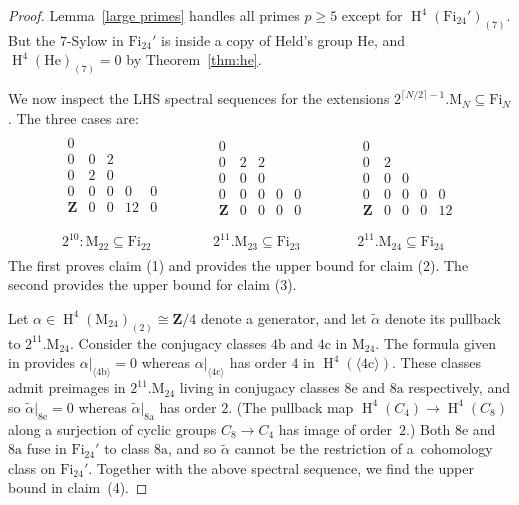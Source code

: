 \documentclass[pdftex]{sigma}
\numberwithin{equation}{section}
\newcommand\bZ{\mathbf Z}
\newcommand\ra{\mathrm a}
\newcommand\rb{\mathrm b}
\newcommand\rc{\mathrm c}
\newcommand\re{\mathrm e}
\newcommand\rM{\mathrm M}
\DeclareMathOperator\homology{H}
\renewcommand\H{\homology}
\newcommand\<\langle
\renewcommand\>\rangle
\newcommand\Fi{\mathrm{Fi}}
\begin{document}
\begin{proof}
 Lemma~\ref{large primes} handles all primes $p\geq 5$ except for $\H^4(\Fi_{24}')_{(7)}$. But the $7$-Sylow in $\Fi_{24}'$ is inside a copy of Held's group $\mathrm{He}$, and $\H^4(\mathrm{He})_{(7)} = 0$ by Theorem~\ref{thm:he}.

 We now inspect the LHS spectral sequences for the extensions $2^{\lceil N/2\rceil - 1}.\rM_N \subseteq \Fi_N$.
 The three cases are:
 \begin{gather*}
 \begin{array}{ccccc}
 \begin{array}{ccccc}
 0 \\
 0 & 0 & 2 \\
 0 & 2 & 0 \\
 0 & 0 & 0 & 0 & 0 \\
 \bZ & 0 & 0 & 12 & 0 \\
 \end{array}
 &\qquad&
 \begin{array}{ccccc}
 0 \\
 0 & 2 & 2 \\
 0 & 0 & 0 \\
 0 & 0 & 0 & 0 & 0 \\
 \bZ & 0 & 0 & 0 & 0
 \end{array}
 &\qquad&
 \begin{array}{ccccc}
 0 \\
 0 & 2 & \\
 0 & 0 & 0 \\
 0 & 0 & 0 & 0 & 0 \\
 \bZ & 0 & 0 & 0 & 12
 \end{array}
 \\ \\
 2^{10}:\rM_{22} \subseteq \Fi_{22}
 &&
 2^{11}.\rM_{23} \subseteq \Fi_{23}
 &&
 2^{11}.\rM_{24} \subseteq \Fi_{24}
 \end{array}
 \end{gather*}
 The first proves claim (1) and provides the upper bound for claim (2). The second provides the upper bound for claim (3).

 Let $\alpha \in \H^4(\rM_{24})_{(2)} \cong \bZ/4$ denote a generator, and let $\tilde\alpha$ denote its pullback to $2^{11}.\rM_{24}$. Consider the conjugacy classes $4\rb$ and $4\rc$ in $\rM_{24}$. The formula given in \cite[Section~3.3]{GPRV} provides $\alpha|_{\langle 4\rb\rangle } = 0$ whereas $\alpha|_{\langle 4\rc\rangle}$ has order $4$ in $\H^4(\langle 4\rc\rangle)$. These classes admit preimages in $2^{11}.\rM_{24}$ living in conjugacy classes $8\re$ and $8\ra$ respectively, and so $\tilde\alpha|_{8\re} = 0$ whereas $\tilde\alpha|_{8\ra}$ has order $2$. (The pullback map $\H^4(C_4) \to \H^4(C_8)$ along a surjection of cyclic groups $C_8 \to C_4$ has image of order~$2$.) Both $8\re$ and $8\ra$ fuse in $\Fi_{24}'$ to class $8\ra$, and so $\tilde\alpha$ cannot be the restriction of a~cohomology class on $\Fi_{24}'$. Together with the above spectral sequence, we find the upper bound in claim~(4).


\end{proof}
\end{document}
